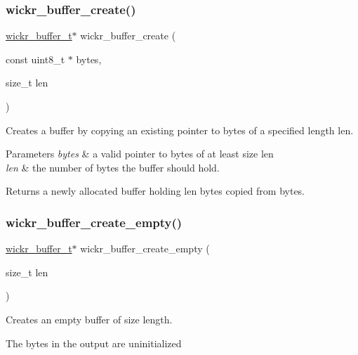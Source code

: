 \subsubsection{\texorpdfstring{wickr\+\_\+buffer\+\_\+create()}{wickr\_buffer\_create()}}
{\footnotesize\ttfamily \mbox{\hyperlink{structwickr__buffer}{wickr\+\_\+buffer\+\_\+t}}$\ast$ wickr\+\_\+buffer\+\_\+create (\begin{DoxyParamCaption}\item[{const uint8\+\_\+t $\ast$}]{bytes,  }\item[{size\+\_\+t}]{len }\end{DoxyParamCaption})}



Creates a buffer by copying an existing pointer to bytes of a specified length len. 


\begin{DoxyParams}{Parameters}
{\em bytes} & a valid pointer to bytes of at least size len \\
\hline
{\em len} & the number of bytes the buffer should hold. \\
\hline
\end{DoxyParams}
\begin{DoxyReturn}{Returns}
a newly allocated buffer holding len bytes copied from bytes. 
\end{DoxyReturn}
\mbox{\label{group__wickr__buffer_ga305edd191e38eb040710b631c1e4f05f}} 
\subsubsection{\texorpdfstring{wickr\+\_\+buffer\+\_\+create\+\_\+empty()}{wickr\_buffer\_create\_empty()}}
{\footnotesize\ttfamily \mbox{\hyperlink{structwickr__buffer}{wickr\+\_\+buffer\+\_\+t}}$\ast$ wickr\+\_\+buffer\+\_\+create\+\_\+empty (\begin{DoxyParamCaption}\item[{size\+\_\+t}]{len }\end{DoxyParamCaption})}



Creates an empty buffer of size length. 

The bytes in the output are uninitialized


